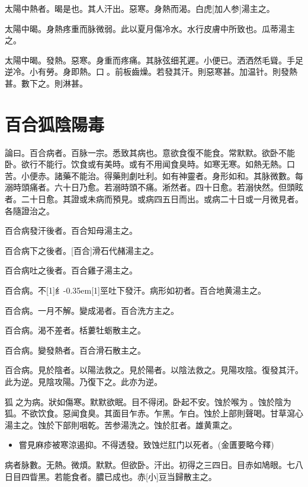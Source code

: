 \documentclass[11pt,oneside,b5paper]{ctexbook}
\begin{document}
\begin{flushleft}
太陽中熱者。暍是也。其人汗出。惡寒。身熱而渴。白虎[加人参]湯主之。

太陽中暍。身熱疼重而脉微弱。此以夏月傷冷水。水行皮膚中所致也。瓜蒂湯主之。

太陽中暍。發熱。惡寒。身重而疼痛。其脉弦细芤遲。小便已。洒洒然毛聳。手足逆冷。小有勞。身即熱。口{𫔭}。前板齒燥。若發其汗。則惡寒甚。加温针。則發熱甚。數下之。則淋甚。

\chapter{百合狐陰陽毒}

論曰。百合病者。百脉一宗。悉致其病也。意欲食復不能食。常默默。欲卧不能卧。欲行不能行。饮食或有美時。或有不用闻食臭時。如寒无寒。如熱无熱。口苦。小便赤。諸藥不能治。得藥則劇吐利。如有神靈者。身形如和。其脉微數。每溺時頭痛者。六十日乃愈。若溺時頭不痛。淅然者。四十日愈。若溺快然。但頭眩者。二十日愈。其證或未病而預見。或病四五日而出。或病二十日或一月微見者。各隨證治之。

百合病發汗後者。百合知母湯主之。

百合病下之後者。[百合]滑石代赭湯主之。

百合病吐之後者。百合雞子湯主之。

百合病。不{\hbox{\scalebox{0.68}[1]{纟}\kern-0.35em\scalebox{0.64}[1]{巠}}}吐下發汗。病形如初者。百合地黄湯主之。

百合病。一月不解。變成渴者。百合洗方主之。

百合病。渴不差者。栝蔞牡蛎散主之。

百合病。變發熱者。百合滑石散主之。

百合病。見於陰者。以陽法救之。見於陽者。以陰法救之。見陽攻陰。復發其汗。此为逆。見陰攻陽。乃復下之。此亦为逆。

狐{𧌒}之为病。狀如傷寒。默默欲眠。目不得闭。卧起不安。蚀於喉为{𧌒}。蚀於陰为狐。不欲饮食。惡闻食臭。其面目乍赤。乍黑。乍白。蚀於上部則聲喝。甘草瀉心湯主之。蚀於下部則咽乾。苦参湯洗之。蚀於肛者。雄黄熏之。

\begin{itemize}
\item 嘗見麻疹被寒涼遏抑。不得透發。致蚀烂肛门以死者。(金匱要略今釋)
\end{itemize}

病者脉數。无熱。微煩。默默。但欲卧。汗出。初得之三四日。目赤如鳩眼。七八日目四眥黑。若能食者。膿已成也。赤[小]豆当歸散主之。


\end{flushleft}
\end{document}
